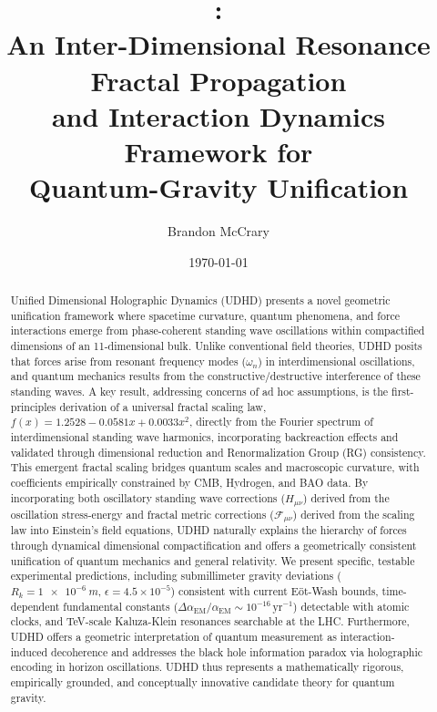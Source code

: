 \documentclass[12pt, a4paper]{article} %
\title{\udhd: \\ An Inter-Dimensional Resonance Fractal Propagation \\ and Interaction Dynamics Framework for \\ Quantum-Gravity Unification}
\author{Brandon McCrary \\}}
\date{\today}
\begin{document}
\maketitle

\begin{abstract}
\noindent
Unified Dimensional Holographic Dynamics (UDHD) presents a novel geometric unification framework where spacetime curvature, quantum phenomena, and force interactions emerge from phase-coherent standing wave oscillations within compactified dimensions of an 11-dimensional bulk. Unlike conventional field theories, UDHD posits that forces arise from resonant frequency modes (\(\omega_n\)) in interdimensional oscillations, and quantum mechanics results from the constructive/destructive interference of these standing waves. A key result, addressing concerns of ad hoc assumptions, is the first-principles derivation of a universal fractal scaling law, \(f(x) = 1.2528 - 0.0581x + 0.0033x^2\), directly from the Fourier spectrum of interdimensional standing wave harmonics, incorporating backreaction effects and validated through dimensional reduction and Renormalization Group (RG) consistency. This emergent fractal scaling bridges quantum scales and macroscopic curvature, with coefficients empirically constrained by CMB, Hydrogen, and BAO data. By incorporating both oscillatory standing wave corrections (\(H_{\mu\nu}\)) derived from the oscillation stress-energy and fractal metric corrections (\(\mathcal{F}_{\mu\nu}\)) derived from the scaling law into Einstein's field equations, UDHD naturally explains the hierarchy of forces through dynamical dimensional compactification and offers a geometrically consistent unification of quantum mechanics and general relativity. We present specific, testable experimental predictions, including submillimeter gravity deviations (\(R_k = \SI{1e-6}{m}\), \(\epsilon = 4.5 \times 10^{-5}\)) consistent with current Eöt-Wash bounds, time-dependent fundamental constants (\(\Delta \alpha_{\text{EM}}/\alpha_{\text{EM}} \sim 10^{-16}\,\text{yr}^{-1}\)) detectable with atomic clocks, and TeV-scale Kaluza-Klein resonances searchable at the LHC. Furthermore, UDHD offers a geometric interpretation of quantum measurement as interaction-induced decoherence and addresses the black hole information paradox via holographic encoding in horizon oscillations. UDHD thus represents a mathematically rigorous, empirically grounded, and conceptually innovative candidate theory for quantum gravity.
\end{abstract}
\end{document}
